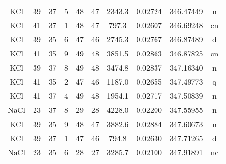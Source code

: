 \begin{table*}[htp]
\begin{tabular}{cccccccccc}
KCl & 39 & 37 & 5 & 48 & 47 & 2343.3 & 0.02724 & 346.47449 & n \\
KCl & 41 & 37 & 1 & 48 & 47 & 797.3 & 0.02607 & 346.69248 & cn \\
KCl & 39 & 35 & 6 & 47 & 46 & 2745.3 & 0.02767 & 346.87489 & d \\
KCl & 41 & 35 & 9 & 49 & 48 & 3851.5 & 0.02863 & 346.87825 & cn \\
KCl & 39 & 37 & 8 & 49 & 48 & 3474.8 & 0.02837 & 347.16340 & n \\
KCl & 41 & 35 & 2 & 47 & 46 & 1187.0 & 0.02655 & 347.49773 & q \\
KCl & 41 & 37 & 4 & 49 & 48 & 1954.1 & 0.02717 & 347.50839 & n \\
NaCl & 23 & 37 & 8 & 29 & 28 & 4228.0 & 0.02200 & 347.55955 & n \\
KCl & 39 & 35 & 9 & 48 & 47 & 3882.6 & 0.02884 & 347.60673 & n \\
KCl & 39 & 37 & 1 & 47 & 46 & 794.8 & 0.02630 & 347.71265 & d \\
NaCl & 23 & 35 & 6 & 28 & 27 & 3285.7 & 0.02100 & 347.91891 & nc \\
\hline
\end{tabular}

\par 
\end{table*}
